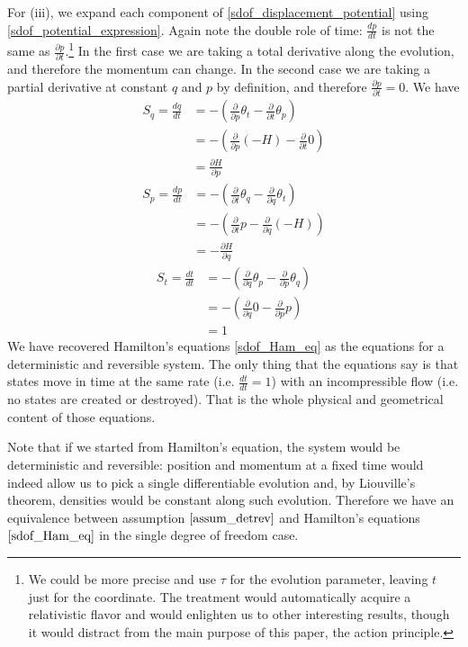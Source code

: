 \documentclass[10pt,twocolumn, nofootinbib]{revtex4-2}
\begin{document}
For (iii), we expand each component of \ref{sdof_displacement_potential} using \ref{sdof_potential_expression}. Again note the double role of time: $\frac{dp}{dt}$ is not the same as $\frac{\partial p}{\partial t}$.\footnote{We could be more precise and use $\tau$ for the evolution parameter, leaving $t$ just for the coordinate. The treatment would automatically acquire a relativistic flavor and would enlighten us to other interesting results, though it would distract from the main purpose of this paper, the action principle. } In the first case we are taking a total derivative along the evolution, and therefore the momentum can change. In the second case we are taking a partial derivative at constant $q$ and $p$ by definition, and therefore $\frac{\partial p}{\partial t}=0$. We have
\begin{align*}
	S_q = \frac{dq}{dt}
	&= - \left( \frac{\partial}{\partial p} \theta_t - \frac{\partial}{\partial t} \theta_p \right) \\
	&= - \left( \frac{\partial}{\partial p} (-H) - \frac{\partial}{\partial t} 0 \right) \\
	& = \frac{\partial H}{\partial p}
\end{align*}
\begin{align*}
	S_p = \frac{dp}{dt}
	&= - \left( \frac{\partial}{\partial t} \theta_q - \frac{\partial}{\partial q} \theta_t \right) \\
	&= - \left( \frac{\partial}{\partial t} p - \frac{\partial}{\partial q} (-H) \right) \\
	& = - \frac{\partial H}{\partial q}
\end{align*}
\begin{align*}
	S_t = \frac{dt}{dt}
	&= - \left( \frac{\partial}{\partial q} \theta_p - \frac{\partial}{\partial p} \theta_q \right) \\
	&= - \left( \frac{\partial}{\partial q} 0 - \frac{\partial}{\partial p} p \right) \\
	& = 1
\end{align*}
We have recovered Hamilton's equations \ref{sdof_Ham_eq} as the equations for a deterministic and reversible system. The only thing that the equations say is that states move in time at the same rate (i.e. $\frac{dt}{dt} = 1$) with an incompressible flow (i.e. no states are created or destroyed). That is the whole physical and geometrical content of those equations.

Note that if we started from Hamilton's equation, the system would be deterministic and reversible: position and momentum at a fixed time would indeed allow us to pick a single differentiable evolution and, by Liouville's theorem, densities would be constant along such evolution. Therefore we have an equivalence between assumption $\ref{assum_detrev}$ and Hamilton's equations $\ref{sdof_Ham_eq}$ in the single degree of freedom case.
\end{document}
